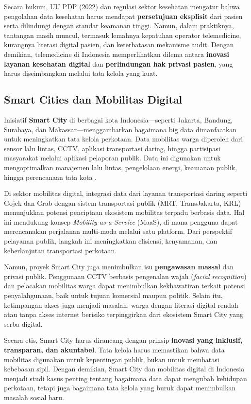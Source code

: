 Secara hukum, UU PDP (2022) dan regulasi sektor kesehatan mengatur bahwa pengolahan data kesehatan harus mendapat \textbf{persetujuan eksplisit} dari pasien serta dilindungi dengan standar keamanan tinggi. Namun, dalam praktiknya, tantangan masih muncul, termasuk lemahnya kepatuhan operator telemedicine, kurangnya literasi digital pasien, dan keterbatasan mekanisme audit. Dengan demikian, telemedicine di Indonesia memperlihatkan dilema antara \textbf{inovasi layanan kesehatan digital} dan \textbf{perlindungan hak privasi pasien}, yang harus diseimbangkan melalui tata kelola yang kuat.

\subsection{Smart Cities dan Mobilitas Digital}

Inisiatif \textbf{Smart City} di berbagai kota Indonesia—seperti Jakarta, Bandung, Surabaya, dan Makassar—menggambarkan bagaimana big data dimanfaatkan untuk meningkatkan tata kelola perkotaan. Data mobilitas warga diperoleh dari sensor lalu lintas, CCTV, aplikasi transportasi daring, hingga partisipasi masyarakat melalui aplikasi pelaporan publik. Data ini digunakan untuk mengoptimalkan manajemen lalu lintas, pengelolaan energi, keamanan publik, hingga perencanaan tata kota \cite{curry2016}.  

Di sektor mobilitas digital, integrasi data dari layanan transportasi daring seperti Gojek dan Grab dengan sistem transportasi publik (MRT, TransJakarta, KRL) menunjukkan potensi penciptaan ekosistem mobilitas terpadu berbasis data. Hal ini mendukung konsep \textit{Mobility-as-a-Service} (MaaS), di mana pengguna dapat merencanakan perjalanan multi-moda melalui satu platform. Dari perspektif pelayanan publik, langkah ini meningkatkan efisiensi, kenyamanan, dan keberlanjutan transportasi perkotaan.  

Namun, proyek Smart City juga menimbulkan isu \textbf{pengawasan massal} dan privasi publik. Penggunaan CCTV berbasis pengenalan wajah (\textit{facial recognition}) dan pelacakan mobilitas warga dapat menimbulkan kekhawatiran terkait potensi penyalahgunaan, baik untuk tujuan komersial maupun politik. Selain itu, ketimpangan akses juga menjadi masalah: warga dengan literasi digital rendah atau tanpa akses internet berisiko terpinggirkan dari ekosistem Smart City yang serba digital.  

Secara etis, Smart City harus dirancang dengan prinsip \textbf{inovasi yang inklusif, transparan, dan akuntabel}. Tata kelola harus memastikan bahwa data mobilitas digunakan untuk kepentingan publik, bukan untuk membatasi kebebasan sipil. Dengan demikian, Smart City dan mobilitas digital di Indonesia menjadi studi kasus penting tentang bagaimana data dapat mengubah kehidupan perkotaan, tetapi juga bagaimana tata kelola yang buruk dapat menimbulkan masalah sosial baru.

